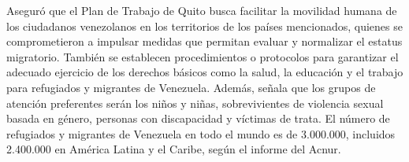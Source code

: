\documentclass{article}%
\begin{document}
\newline%
%
Aseguró que el Plan de Trabajo de Quito busca facilitar la movilidad humana de los ciudadanos venezolanos en los territorios de los países mencionados, quienes se comprometieron a impulsar medidas que permitan evaluar y normalizar el estatus migratorio.%
\newline%
%
También se establecen procedimientos o protocolos para garantizar el adecuado ejercicio de los derechos básicos como la salud, la educación y el trabajo para refugiados y migrantes de Venezuela.%
\newline%
%
Además, señala que los grupos de atención preferentes serán los niños y niñas, sobrevivientes de violencia sexual basada en género, personas con discapacidad y víctimas de trata.%
\newline%
%
El número de refugiados y migrantes de Venezuela en todo el mundo es de 3.000.000, incluidos 2.400.000 en América Latina y el Caribe, según el informe del Acnur.%
\newline%
%
\end{document}
